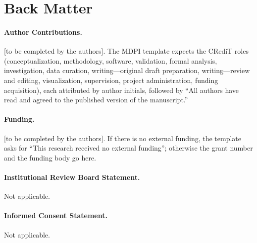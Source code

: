 \documentclass[11pt,a4paper]{article}
\theoremstyle{plain}
\theoremstyle{definition}
\theoremstyle{remark}
\begin{document}

\section*{Back Matter}

\paragraph{Author Contributions.}
[to be completed by the authors]. The MDPI template expects the CRediT roles
(conceptualization, methodology, software, validation, formal analysis,
investigation, data curation, writing---original draft preparation,
writing---review and editing, visualization, supervision, project
administration, funding acquisition), each attributed by author initials,
followed by ``All authors have read and agreed to the published version of the
manuscript.''

\paragraph{Funding.}
[to be completed by the authors]. If there is no external funding, the template
asks for ``This research received no external funding''; otherwise the grant
number and the funding body go here.

\paragraph{Institutional Review Board Statement.}
Not applicable.

\paragraph{Informed Consent Statement.}
Not applicable.
\end{document}
